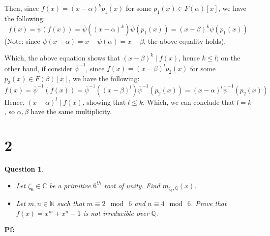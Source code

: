 \documentclass{article}
\newtheorem{question}{Question}
\begin{document}
Then, since $f(x)=(x-\alpha)^kp_1(x)$ for some $p_1(x)\in F(\alpha)[x]$, we have the following:
$$f(x)=\overline{\psi}(f(x)) = \overline{\psi}((x-\alpha)^k)\overline{\psi}(p_1(x)) = (x-\beta)^k\overline{\psi}(p_1(x))$$
(Note: since $\overline{\psi}(x-\alpha) = x-\psi(\alpha)=x-\beta$, the above equality holds).

Which, the above equation shows that $(x-\beta)^k\mid f(x)$, hence $k\leq l$;
on the other hand, if consider $\overline{\psi}^{-1}$, since $f(x)=(x-\beta)^lp_2(x)$ for some $p_2(x)\in F(\beta)[x]$, we have the following:
$$f(x)=\overline{\psi}^{-1}(f(x))=\overline{\psi}^{-1}((x-\beta)^l)\overline{\psi}^{-1}(p_2(x)) = (x-\alpha)^l\overline{\psi}^{-1}(p_2(x))$$
Hence, $(x-\alpha)^l\mid f(x)$, showing that $l\leq k$. Which, we can conclude that $l=k$, so $\alpha,\beta$ have the same multiplicity.

\break

\section*{2}
\begin{myBox}[]{}
    \begin{question}
        
        \hfil

        \begin{itemize}
            \item[(a)] Let $\zeta_6\in\mathbb{C}$ be a primitive $6^{th}$ root of unity. Find $m_{\zeta_6,\mathbb{Q}}(x)$.
            \item[(b)] Let $m,n\in\mathbb{N}$ such that $m\equiv 2\mod\ 6$ and $n\equiv 4\mod\ 6$. Prove that $f(x)=x^m+x^n+1$ is not irreducible over $\mathbb{Q}$. 
        \end{itemize}
    \end{question}
\end{myBox}

\textbf{Pf:}
\end{document}
